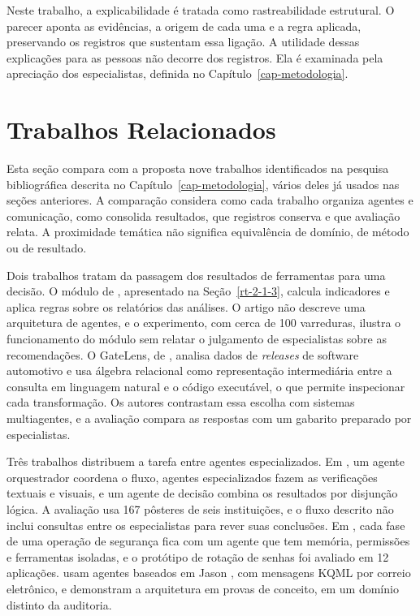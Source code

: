 Neste trabalho, a explicabilidade é tratada como rastreabilidade estrutural. O parecer aponta as evidências, a origem de cada uma e a regra aplicada, preservando os registros que sustentam essa ligação. A utilidade dessas explicações para as pessoas não decorre dos registros. Ela é examinada pela apreciação dos especialistas, definida no Capítulo~\ref{cap-metodologia}.

\section{Trabalhos Relacionados}
\label{rt-2-6}

Esta seção compara com a proposta nove trabalhos identificados na pesquisa bibliográfica descrita no Capítulo~\ref{cap-metodologia}, vários deles já usados nas seções anteriores. A comparação considera como cada trabalho organiza agentes e comunicação, como consolida resultados, que registros conserva e que avaliação relata. A proximidade temática não significa equivalência de domínio, de método ou de resultado.

Dois trabalhos tratam da passagem dos resultados de ferramentas para uma decisão. O módulo de , apresentado na Seção~\ref{rt-2-1-3}, calcula indicadores e aplica regras sobre os relatórios das análises. O artigo não descreve uma arquitetura de agentes, e o experimento, com cerca de 100 varreduras, ilustra o funcionamento do módulo sem relatar o julgamento de especialistas sobre as recomendações. O GateLens, de , analisa dados de \textit{releases} de software automotivo e usa álgebra relacional como representação intermediária entre a consulta em linguagem natural e o código executável, o que permite inspecionar cada transformação. Os autores contrastam essa escolha com sistemas multiagentes, e a avaliação compara as respostas com um gabarito preparado por especialistas.

Três trabalhos distribuem a tarefa entre agentes especializados. Em , um agente orquestrador coordena o fluxo, agentes especializados fazem as verificações textuais e visuais, e um agente de decisão combina os resultados por disjunção lógica. A avaliação usa 167 pôsteres de seis instituições, e o fluxo descrito não inclui consultas entre os especialistas para rever suas conclusões. Em , cada fase de uma operação de segurança fica com um agente que tem memória, permissões e ferramentas isoladas, e o protótipo de rotação de senhas foi avaliado em 12 aplicações.  usam agentes baseados em Jason \cite{bordini2007}, com mensagens KQML por correio eletrônico, e demonstram a arquitetura em provas de conceito, em um domínio distinto da auditoria.

